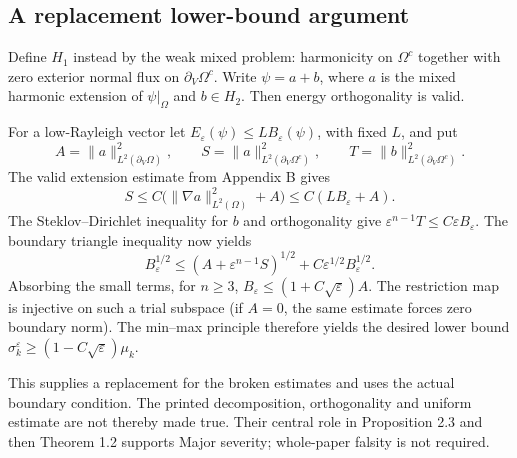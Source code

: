 \documentclass[10pt]{article}
\begin{document}
\subsection*{A replacement lower-bound argument}
Define \(H_1\) instead by the weak mixed problem: harmonicity on \(\Omega^c\) together with zero exterior normal flux on \(\partial_V\Omega^c\). Write \(\psi=a+b\), where \(a\) is the mixed harmonic extension of \(\psi|_\Omega\) and \(b\in H_2\). Then energy orthogonality is valid.\par
For a low-Rayleigh vector let \(E_\varepsilon(\psi)\leq L B_\varepsilon(\psi)\), with fixed \(L\), and put \[A=\|a\|_{L^2(\partial_V\Omega)}^2,\qquad
 S=\|a\|_{L^2(\partial_V\Omega^c)}^2,\qquad
 T=\|b\|_{L^2(\partial_V\Omega^c)}^2.\] The valid extension estimate from Appendix B gives \[S\leq C\big(\|\nabla a\|_{L^2(\Omega)}^2+A\big)
   \leq C(LB_\varepsilon+A).\] The Steklov–Dirichlet inequality for \(b\) and orthogonality give \(\varepsilon^{n-1}T\leq C\varepsilon B_\varepsilon\). The boundary triangle inequality now yields \[B_\varepsilon^{1/2}
 \leq (A+\varepsilon^{n-1}S)^{1/2}
           +C\varepsilon^{1/2}B_\varepsilon^{1/2}.\] Absorbing the small terms, for \(n\geq3\), \(B_\varepsilon\leq(1+C\sqrt\varepsilon)A\). The restriction map is injective on such a trial subspace (if \(A=0\), the same estimate forces zero boundary norm). The min–max principle therefore yields the desired lower bound \(\sigma_k^\varepsilon\geq(1-C\sqrt\varepsilon)\mu_k\).\par
This supplies a replacement for the broken estimates and uses the actual boundary condition. The printed decomposition, orthogonality and uniform estimate are not thereby made true. Their central role in Proposition 2.3 and then Theorem 1.2 supports Major severity; whole-paper falsity is not required.\par
\end{document}
